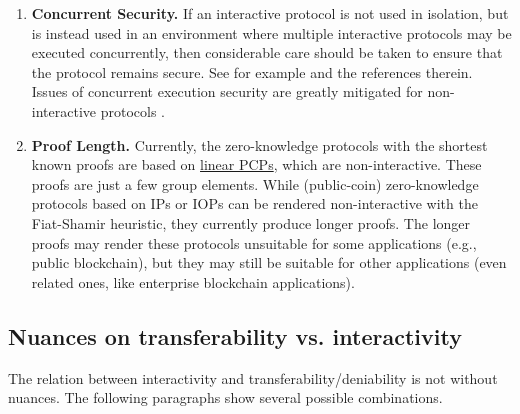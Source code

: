 \begin{enumerate}[label=\arabic*.]
\item \textbf{Concurrent Security.}  
If an interactive protocol is not used in isolation, but is instead used in an environment where multiple interactive protocols may be executed concurrently, then considerable care should be taken to ensure that the protocol remains secure. 
See for example \cite[Section 2.1]{2013:CISS:a-short-tutorial-on-zero-knowledge} and the references therein. 
Issues of concurrent execution security are greatly mitigated for non-interactive protocols \cite{2006:eurocrypt:perfect-NIZK-for-NP}. 

\item \textbf{Proof Length.} 
Currently, the zero-knowledge protocols with the shortest known proofs are based on \hyperref[paradigms:IT:linear-PCP]{linear PCPs}, which are non-interactive. 
These proofs are just a few group elements. 
While (public-coin) zero-knowledge protocols based on IPs or IOPs can be rendered non-interactive with the Fiat-Shamir heuristic, they currently produce longer proofs. 
The longer proofs may render these protocols unsuitable for some applications (e.g., public blockchain), but they may still be suitable for other applications (even related ones, like enterprise blockchain applications).

\end{enumerate}



\subsection{Nuances on transferability vs. interactivity}
\label{sec:paradigms:interactivity:transferability-deniability}
	
The relation between interactivity and transferability/deniability is not without nuances.
The following paragraphs show several possible combinations.
\loosen


